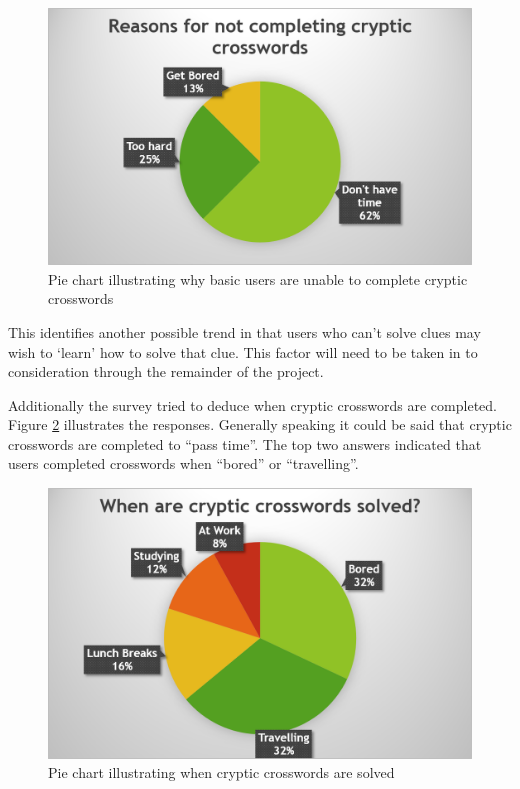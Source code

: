 \begin{figure}[H]
  \centering
  \includegraphics[scale=0.9]{graphs/incomplete_2.png}
  \caption{Pie chart illustrating why basic users are unable to complete cryptic
          crosswords}
  \label{fig:incompleted}
\end{figure}

This identifies another possible trend in that users who can't solve clues may 
wish to `learn' how to solve that clue. This factor will need to be taken in to
consideration through the remainder of the project.

Additionally the survey tried to deduce when cryptic crosswords are completed. 
Figure \ref{fig:when_solved} illustrates the responses. Generally speaking it 
could be said that cryptic crosswords are completed to ``pass time''. The top 
two answers indicated that users completed crosswords when ``bored'' or 
``travelling''.

\begin{figure}[H]
  \centering
  \includegraphics[scale=0.9]{graphs/when_solved.png}
  \caption{Pie chart illustrating when cryptic crosswords are solved}
  \label{fig:when_solved}
\end{figure}


